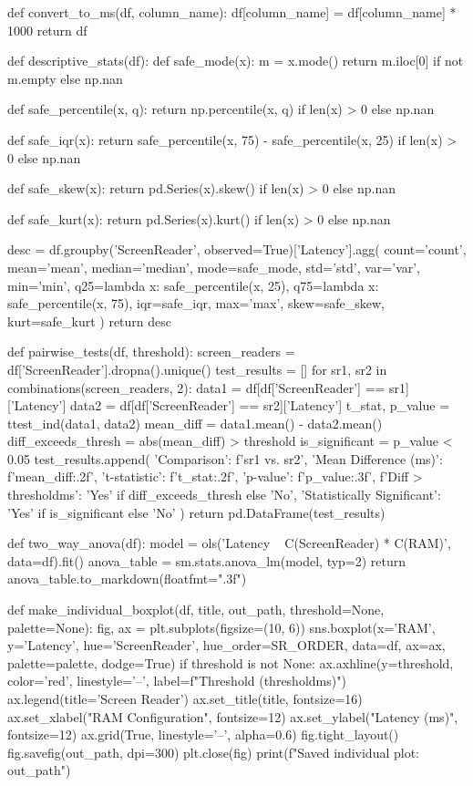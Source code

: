 \begin{pyverbatim}
	def convert_to_ms(df, column_name):
	df[column_name] = df[column_name] * 1000
	return df

	def descriptive_stats(df):
	def safe_mode(x):
	m = x.mode()
	return m.iloc[0] if not m.empty else np.nan

	def safe_percentile(x, q):
	return np.percentile(x, q) if len(x) > 0 else np.nan

	def safe_iqr(x):
	return safe_percentile(x, 75) - safe_percentile(x, 25) if len(x) > 0 else np.nan

	def safe_skew(x):
	return pd.Series(x).skew() if len(x) > 0 else np.nan

	def safe_kurt(x):
	return pd.Series(x).kurt() if len(x) > 0 else np.nan

	desc = df.groupby('ScreenReader', observed=True)['Latency'].agg(
	count='count',
	mean='mean',
	median='median',
	mode=safe_mode,
	std='std',
	var='var',
	min='min',
	q25=lambda x: safe_percentile(x, 25),
	q75=lambda x: safe_percentile(x, 75),
	iqr=safe_iqr,
	max='max',
	skew=safe_skew,
	kurt=safe_kurt
	)
	return desc


	def pairwise_tests(df, threshold):
	screen_readers = df['ScreenReader'].dropna().unique()
	test_results = []
	for sr1, sr2 in combinations(screen_readers, 2):
	data1 = df[df['ScreenReader'] == sr1]['Latency']
	data2 = df[df['ScreenReader'] == sr2]['Latency']
	t_stat, p_value = ttest_ind(data1, data2)
	mean_diff = data1.mean() - data2.mean()
	diff_exceeds_thresh = abs(mean_diff) > threshold
	is_significant = p_value < 0.05
	test_results.append({
	'Comparison': f'{sr1} vs. {sr2}',
	'Mean Difference (ms)': f'{mean_diff:.2f}',
	't-statistic': f'{t_stat:.2f}',
	'p-value': f'{p_value:.3f}',
	f'Diff > {threshold}ms': 'Yes' if diff_exceeds_thresh else 'No',
	'Statistically Significant': 'Yes' if is_significant else 'No'
	})
	return pd.DataFrame(test_results)

	def two_way_anova(df):
	model = ols('Latency ~ C(ScreenReader) * C(RAM)', data=df).fit()
	anova_table = sm.stats.anova_lm(model, typ=2)
	return anova_table.to_markdown(floatfmt=".3f")

	def make_individual_boxplot(df, title, out_path, threshold=None, palette=None):
	fig, ax = plt.subplots(figsize=(10, 6))
	sns.boxplot(x='RAM', y='Latency', hue='ScreenReader', hue_order=SR_ORDER,
	data=df, ax=ax, palette=palette, dodge=True)
	if threshold is not None:
	ax.axhline(y=threshold, color='red', linestyle='--', label=f"Threshold ({threshold}ms)")
	ax.legend(title='Screen Reader')
	ax.set_title(title, fontsize=16)
	ax.set_xlabel("RAM Configuration", fontsize=12)
	ax.set_ylabel("Latency (ms)", fontsize=12)
	ax.grid(True, linestyle='--', alpha=0.6)
	fig.tight_layout()
	fig.savefig(out_path, dpi=300)
	plt.close(fig)
	print(f"Saved individual plot: {out_path}")


\end{pyverbatim}
